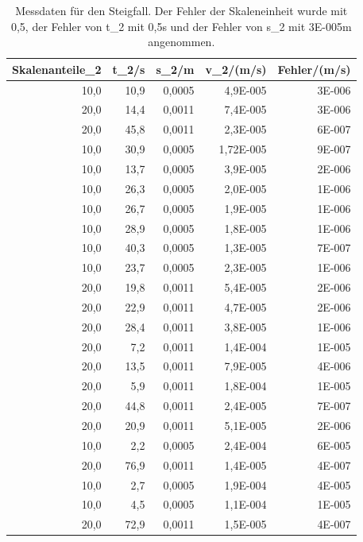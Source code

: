 \documentclass[12pt]{scrartcl}
\begin{document}
\begin{table}[H]
\caption{Messdaten für den Steigfall. Der Fehler der Skaleneinheit wurde mit 0,5, der Fehler von t\_2 mit 0,5s und der Fehler von s\_2 mit  3E-005m angenommen.}
\begin{center}
\begin{tabular}{|r|r|r|r|r|}
\hline
\multicolumn{1}{|l|}{Skalenanteile\_2} & \multicolumn{1}{l|}{t\_2/s} & \multicolumn{1}{l|}{s\_2/m} & \multicolumn{1}{l|}{v\_2/(m/s)} & \multicolumn{1}{l|}{Fehler/(m/s)} \\ \hline
10,0 & 10,9 & 0,0005 & 4,9E-005 & 3E-006 \\ \hline
20,0 & 14,4 & 0,0011 & 7,4E-005 & 3E-006 \\ \hline
20,0 & 45,8 & 0,0011 & 2,3E-005 & 6E-007 \\ \hline
10,0 & 30,9 & 0,0005 & 1,72E-005 & 9E-007 \\ \hline
10,0 & 13,7 & 0,0005 & 3,9E-005 & 2E-006 \\ \hline
10,0 & 26,3 & 0,0005 & 2,0E-005 & 1E-006 \\ \hline
10,0 & 26,7 & 0,0005 & 1,9E-005 & 1E-006 \\ \hline
10,0 & 28,9 & 0,0005 & 1,8E-005 & 1E-006 \\ \hline
10,0 & 40,3 & 0,0005 & 1,3E-005 & 7E-007 \\ \hline
10,0 & 23,7 & 0,0005 & 2,3E-005 & 1E-006 \\ \hline
20,0 & 19,8 & 0,0011 & 5,4E-005 & 2E-006 \\ \hline
20,0 & 22,9 & 0,0011 & 4,7E-005 & 2E-006 \\ \hline
20,0 & 28,4 & 0,0011 & 3,8E-005 & 1E-006 \\ \hline
20,0 & 7,2 & 0,0011 & 1,4E-004 & 1E-005 \\ \hline
20,0 & 13,5 & 0,0011 & 7,9E-005 & 4E-006 \\ \hline
20,0 & 5,9 & 0,0011 & 1,8E-004 & 1E-005 \\ \hline
20,0 & 44,8 & 0,0011 & 2,4E-005 & 7E-007 \\ \hline
20,0 & 20,9 & 0,0011 & 5,1E-005 & 2E-006 \\ \hline
10,0 & 2,2 & 0,0005 & 2,4E-004 & 6E-005 \\ \hline
20,0 & 76,9 & 0,0011 & 1,4E-005 & 4E-007 \\ \hline
10,0 & 2,7 & 0,0005 & 1,9E-004 & 4E-005 \\ \hline
10,0 & 4,5 & 0,0005 & 1,1E-004 & 1E-005 \\ \hline
20,0 & 72,9 & 0,0011 & 1,5E-005 & 4E-007 \\ \hline

\end{tabular}
\end{center}
\end{table}
\end{document}
